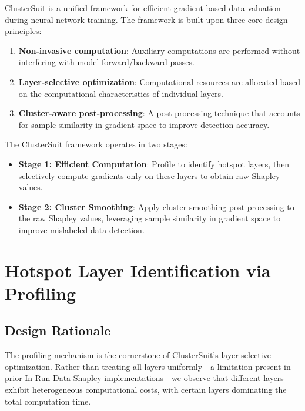 \documentclass[12pt,a4paper]{report}
\begin{document}
ClusterSuit is a unified framework for efficient gradient-based data valuation during neural network training. The framework is built upon three core design principles:

\begin{enumerate}
    \item \textbf{Non-invasive computation}: Auxiliary computations are performed without interfering with model forward/backward passes.
    
    \item \textbf{Layer-selective optimization}: Computational resources are allocated based on the computational characteristics of individual layers.
    
    \item \textbf{Cluster-aware post-processing}: A post-processing technique that accounts for sample similarity in gradient space to improve detection accuracy.
\end{enumerate}

The ClusterSuit framework operates in two stages:

\begin{itemize}
    \item \textbf{Stage 1: Efficient Computation}: Profile to identify hotspot layers, then selectively compute gradients only on these layers to obtain raw Shapley values.
    
    \item \textbf{Stage 2: Cluster Smoothing}: Apply cluster smoothing post-processing to the raw Shapley values, leveraging sample similarity in gradient space to improve mislabeled data detection.
\end{itemize}

\section{Hotspot Layer Identification via Profiling}
\label{sec:hotspot_identification}

\subsection{Design Rationale}
\label{sec:profiling_rationale}

The profiling mechanism is the cornerstone of ClusterSuit's layer-selective optimization. Rather than treating all layers uniformly---a limitation present in prior In-Run Data Shapley implementations---we observe that different layers exhibit heterogeneous computational costs, with certain layers dominating the total computation time.
\end{document}
